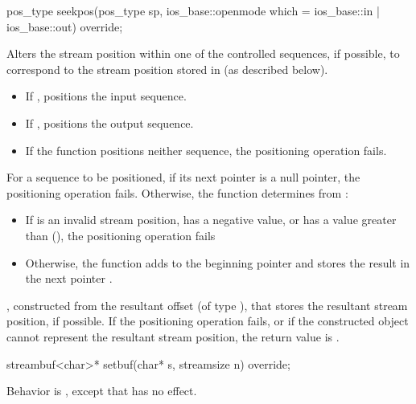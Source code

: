 %
\begin{itemdecl}
pos_type seekpos(pos_type sp, ios_base::openmode which = ios_base::in | ios_base::out) override;
\end{itemdecl}

\begin{itemdescr}
\pnum
\effects
Alters the stream position within one of the
controlled sequences, if possible, to correspond to the
stream position stored in 
(as described below).
\begin{itemize}
\item
If
,
positions the input sequence.
\item
If
,
positions the output sequence.
\item
If the function positions neither sequence, the positioning operation fails.
\end{itemize}

\pnum
For a sequence to be positioned, if its next pointer is a null pointer,
the positioning operation fails.
Otherwise, the function determines  from
:
\begin{itemize}
\item
If  is an invalid stream position,
has a negative value, or
has a value greater than (),
the positioning operation fails
\item
Otherwise, the function
adds  to the beginning pointer  and
stores the result in the next pointer .
\end{itemize}

\pnum
\returns
{},
constructed from the resultant offset 
(of type
),
that stores the resultant stream position, if possible.
If the positioning operation fails, or
if the constructed object cannot represent the resultant stream position,
the return value is
.
\end{itemdescr}

%
\begin{itemdecl}
streambuf<char>* setbuf(char* s, streamsize n) override;
\end{itemdecl}

\begin{itemdescr}
\pnum
\effects
Behavior is ,
except that
has no effect.%
\end{itemdescr}

